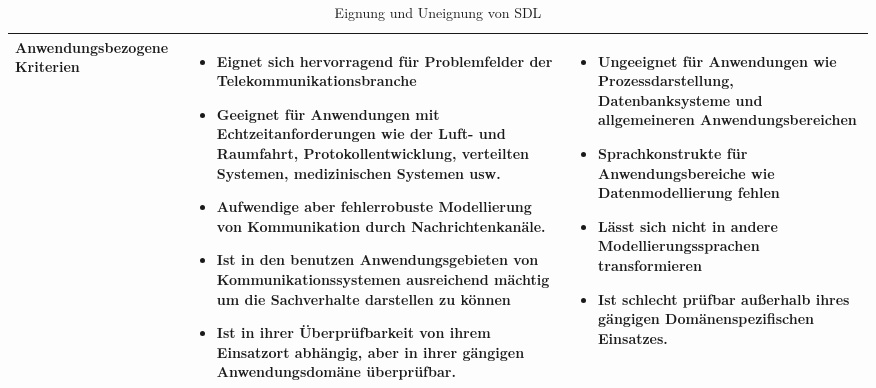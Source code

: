 \begin{table}[ht]
	\begin{tabularx}{\textwidth}{|l|X|X|}
		\hline
		Anwendungsbezogene	Kriterien &
		\begin{itemize}
			\item Eignet sich hervorragend für Problemfelder der Telekommunikationsbranche
			\item Geeignet für Anwendungen mit Echtzeitanforderungen wie der Luft- und Raumfahrt, Protokollentwicklung, verteilten Systemen, medizinischen Systemen usw. 
			\item Aufwendige aber fehlerrobuste	Modellierung von Kommunikation durch Nachrichtenkanäle.
			\item Ist in den benutzen Anwendungsgebieten von Kommunikationssystemen ausreichend mächtig um die Sachverhalte darstellen zu können
			\item Ist in ihrer Überprüfbarkeit von ihrem Einsatzort abhängig, aber in ihrer gängigen Anwendungsdomäne überprüfbar. 
		\end{itemize}  & 
		\begin{itemize}
			\item Ungeeignet für Anwendungen wie Prozessdarstellung, Datenbanksysteme und allgemeineren Anwendungsbereichen
			\item Sprachkonstrukte für Anwendungsbereiche  wie Datenmodellierung fehlen
			\item Lässt sich nicht in andere Modellierungssprachen transformieren
			\item Ist schlecht prüfbar außerhalb ihres gängigen Domänenspezifischen Einsatzes.
		\end{itemize} \\
		\hline
	\end{tabularx} 
\caption{Eignung und Uneignung von SDL}
\label{tab:EignungSDL}
\end{table} 